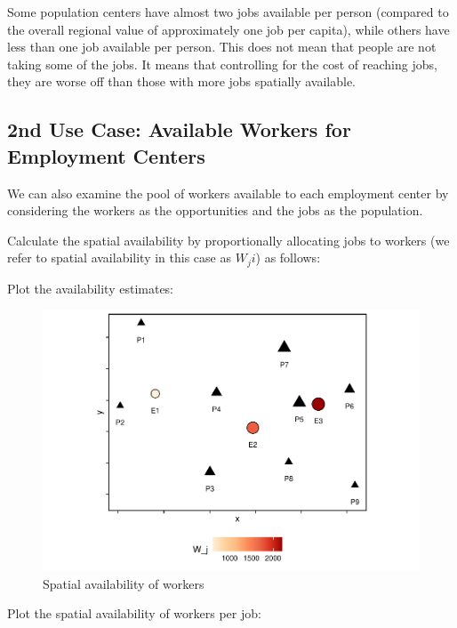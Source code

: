 \documentclass[]{elsarticle} %
\begin{document}
Some population centers have almost two jobs available per person
(compared to the overall regional value of approximately one job per
capita), while others have less than one job available per person. This
does not mean that people are not taking some of the jobs. It means that
controlling for the cost of reaching jobs, they are worse off than those
with more jobs spatially available.

\hypertarget{nd-use-case-available-workers-for-employment-centers}{%
\subsection{2nd Use Case: Available Workers for Employment
Centers}\label{nd-use-case-available-workers-for-employment-centers}}

We can also examine the pool of workers available to each employment
center by considering the workers as the opportunities and the jobs as
the population.

Calculate the spatial availability by proportionally allocating jobs to
workers (we refer to spatial availability in this case as \(W_ji\)) as
follows:

Plot the availability estimates:

\begin{figure}
\includegraphics[width=1\linewidth]{Spatial-Availability_files/figure-latex/toy-example-availability-workers-1} \caption{\label{fig:toy-example-availability-workers}Spatial availability of workers}\label{fig:toy-example-availability-workers}
\end{figure}

Plot the spatial availability of workers per job:
\end{document}

